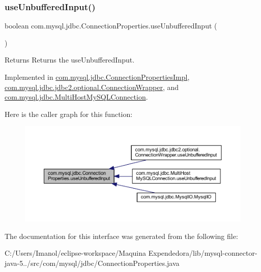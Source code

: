 \subsubsection{\texorpdfstring{use\+Unbuffered\+Input()}{useUnbufferedInput()}}
{\footnotesize\ttfamily boolean com.\+mysql.\+jdbc.\+Connection\+Properties.\+use\+Unbuffered\+Input (\begin{DoxyParamCaption}{ }\end{DoxyParamCaption})}

\begin{DoxyReturn}{Returns}
Returns the use\+Unbuffered\+Input. 
\end{DoxyReturn}


Implemented in \mbox{\hyperlink{classcom_1_1mysql_1_1jdbc_1_1_connection_properties_impl_a26abe51afeb7e57aadd5791da025c68b}{com.\+mysql.\+jdbc.\+Connection\+Properties\+Impl}}, \mbox{\hyperlink{classcom_1_1mysql_1_1jdbc_1_1jdbc2_1_1optional_1_1_connection_wrapper_ae90cf2a8ef9234c774cf9567b48f755f}{com.\+mysql.\+jdbc.\+jdbc2.\+optional.\+Connection\+Wrapper}}, and \mbox{\hyperlink{classcom_1_1mysql_1_1jdbc_1_1_multi_host_my_s_q_l_connection_a5a985fc8b9a0777d6d19e566e8053832}{com.\+mysql.\+jdbc.\+Multi\+Host\+My\+S\+Q\+L\+Connection}}.

Here is the caller graph for this function\+:\nopagebreak
\begin{figure}[H]
\begin{center}
\leavevmode
\includegraphics[width=350pt]{interfacecom_1_1mysql_1_1jdbc_1_1_connection_properties_ae9cefafa60524eaec697493db7349cc1_icgraph}
\end{center}
\end{figure}


The documentation for this interface was generated from the following file\+:\begin{DoxyCompactItemize}
\item 
C\+:/\+Users/\+Imanol/eclipse-\/workspace/\+Maquina Expendedora/lib/mysql-\/connector-\/java-\/5../src/com/mysql/jdbc/Connection\+Properties.\+java\end{DoxyCompactItemize}
